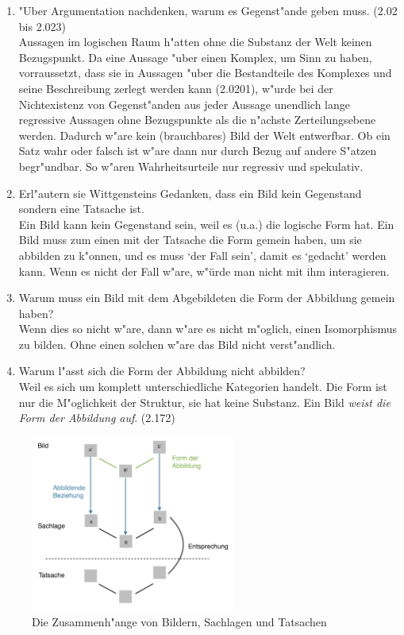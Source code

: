 \documentclass[emulatestandardclasses]{scrartcl}
\begin{document}
\begin{enumerate}
  \item {\color{NavyBlue}"Uber Argumentation nachdenken, warum es Gegenst"ande geben muss. (2.02 bis 2.023)}\\
{\color{ForestGreen} Aussagen im logischen Raum h"atten ohne die Substanz der Welt keinen Bezugspunkt. Da eine Aussage "uber einen Komplex, um Sinn zu haben, vorraussetzt, dass sie in Aussagen "uber die Bestandteile des Komplexes und seine Beschreibung zerlegt werden kann (2.0201), w"urde bei der Nichtexistenz von Gegenst"anden aus jeder Aussage unendlich lange regressive Aussagen ohne Bezugspunkte als die n"achste Zerteilungsebene werden. Dadurch w"are kein (brauchbares) Bild der Welt entwerfbar. Ob ein Satz wahr oder falsch ist w"are dann nur durch Bezug auf andere S"atzen begr"undbar. So w"aren Wahrheitsurteile nur regressiv und spekulativ.}
  \item {\color{NavyBlue}Erl"autern sie Wittgensteins Gedanken, dass ein Bild kein Gegenstand sondern eine Tatsache ist.}\\
{\color{ForestGreen} Ein Bild kann kein Gegenstand sein, weil es (u.a.) die logische Form hat. Ein Bild muss zum einen mit der Tatsache die Form gemein haben, um sie abbilden zu k"onnen, und es muss `der Fall sein', damit es `gedacht' werden kann. Wenn es nicht der Fall w"are, w"ürde man nicht mit ihm interagieren.}
  \item {\color{NavyBlue} Warum muss ein Bild mit dem Abgebildeten die Form der Abbildung gemein haben?}\\
{\color{ForestGreen}Wenn dies so nicht w"are, dann w"are es nicht m"oglich, einen Isomorphismus zu bilden. Ohne einen solchen w"are das Bild nicht verst"andlich.}
  \item {\color{NavyBlue}Warum l"asst sich die Form der Abbildung nicht abbilden?}\\
{\color{ForestGreen} Weil es sich um komplett unterschiedliche Kategorien handelt. Die Form ist nur die M"oglichkeit der Struktur, sie hat keine Substanz. Ein Bild \emph{weist die Form der Abbildung auf}. (2.172)}

\end{enumerate}



\begin{figure}[h]
	\centering
	\includegraphics[width=0.6\textwidth]{images/tractatus/bilder.png}
	\caption{Die Zusammenh"ange von Bildern, Sachlagen und Tatsachen}
	\label{fig:bilder}
\end{figure}
\end{document}
